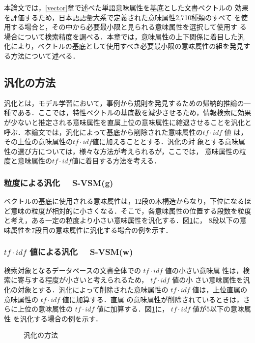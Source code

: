 本論文では，\ref{vector}章で述べた単語意味属性を基底とした文書ベクトルの
効果を評価するため，日本語語彙大系で定義された意味属性2,710種類のすべて
を使用する場合と，その中から必要最小限と見られる意味属性を選択して使用す
る場合について検索精度を調べる．本章では，意味属性の上下関係に着目した汎
化により，ベクトルの基底として使用すべき必要最小限の意味属性の組を発見す
る方法について述べる．

\subsection{汎化の方法}
\label{generation}

汎化とは，モデル学習において，事例から規則を発見するための帰納的推論の一
種である．ここでは，特性ベクトルの基底数を減少させるため，情報検索に効果
が少ないと推定される意味属性を直属上位の意味属性に縮退させることを汎化と
呼ぶ．本論文では，汎化によって基底から削除された意味属性の$tf \cdot idf$
値 は，その上位の意味属性の$tf \cdot idf $値に加えることとする．汎化の対
象とする意味属性の選び方については，様々な方法が考えられるが，ここでは，
意味属性の粒度と意味属性の$tf \cdot idf $値に着目する方法を考える．

\subsubsection{粒度による汎化 \ \ S-VSM(g)}

ベクトルの基底に使用される意味属性は，12段の木構造からなり，下位になるほ
ど意味の粒度が相対的に小さくなる．そこで，各意味属性の位置する段数を粒度
と考え，ある一定の粒度より小さい意味属性を汎化する．図\ref{generation-fig}に，
8段以下の意味属性を7段目の意味属性に汎化する場合の例を示す．

\subsubsection{$tf \cdot idf$ 値による汎化 \ \ S-VSM(w)}

検索対象となるデータベースの文書全体での $tf \cdot idf$ 値の小さい意味属
性は，検索に寄与する程度が小さいと考えられるため， $tf \cdot idf$ 値の小
さい意味属性を汎化の対象とする．汎化によって削除された意味属性の $tf
\cdot idf$ 値は，上位直属の意味属性の $tf \cdot idf$ 値に加算する．直属
の意味属性が削除されているときは，さらに上位の意味属性の $tf \cdot idf$ 
値に加算する．図\ref{generation-fig}に， $tf \cdot idf$ 値が5以下の意味属性
を汎化する場合の例を示す．

\begin{figure}[ht]
 \begin{center}
  
 \end{center}
 \caption{汎化の方法}
 
 \label{generation-fig}
\end{figure}

